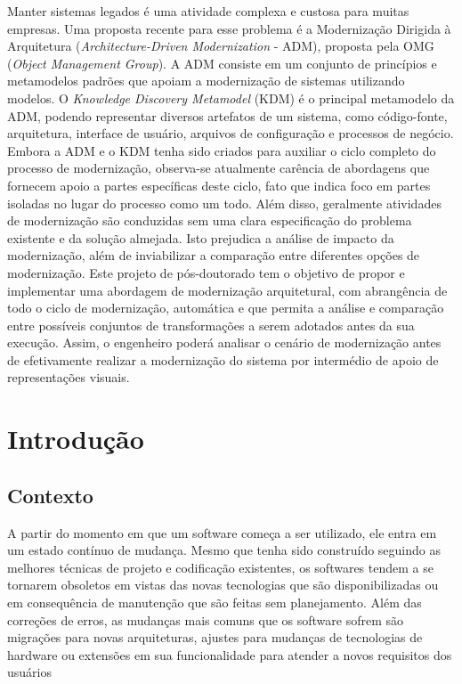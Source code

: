 \documentclass[12pt]{article}
\begin{document}
 

\setlength{\voffset}{0cm}
\setlength{\hoffset}{0cm}



\begin{resumo}
Manter sistemas legados é uma atividade complexa e custosa para muitas empresas. Uma proposta recente para esse problema é a Modernização Dirigida à Arquitetura (\textit{Architecture-Driven Modernization} - ADM), proposta pela OMG (\textit{Object Management Group}). A ADM consiste em um conjunto de princípios e metamodelos padrões que apoiam a modernização de sistemas utilizando modelos. O \textit{Knowledge Discovery Metamodel} (KDM) é o principal metamodelo da ADM, podendo representar diversos artefatos de um sistema, como código-fonte, arquitetura, interface de usuário, arquivos de configuração e processos de negócio. Embora a ADM e o KDM tenha sido criados para auxiliar o ciclo completo do processo de modernização, observa-se atualmente carência de abordagens que fornecem apoio a partes específicas deste ciclo, fato que indica foco em partes isoladas no lugar do processo como um todo. Além disso, geralmente atividades de modernização são conduzidas sem uma clara especificação do problema existente e da solução almejada. Isto prejudica a análise de impacto da modernização, além de inviabilizar a comparação entre diferentes opções de modernização. Este projeto de pós-doutorado tem o objetivo de propor e implementar uma abordagem de modernização arquitetural, com abrangência de todo o ciclo de modernização, automática e que permita a análise e comparação entre possíveis conjuntos de transformações a serem adotados antes da sua execução. Assim, o engenheiro poderá analisar o cenário de modernização antes de efetivamente realizar a modernização do sistema por intermédio de apoio de representações visuais.
\end{resumo}

\section{Introdução}

\subsection{Contexto}

A partir do momento em que um software começa a ser utilizado, ele entra em um estado contínuo de mudança. Mesmo que tenha sido construído seguindo as melhores técnicas de projeto e codificação existentes, os softwares tendem a se tornarem obsoletos em vistas das novas tecnologias que são disponibilizadas ou em consequência de manutenção que são feitas sem planejamento. Além das correções de erros, as mudanças mais comuns que os software sofrem são migrações para novas arquiteturas, ajustes para mudanças de tecnologias de hardware ou extensões em sua funcionalidade para atender a novos requisitos dos usuários~\cite{Krueger92, SoftwareReuse}
\end{document}

